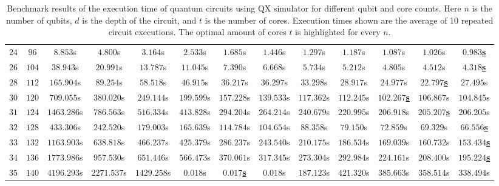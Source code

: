 \begin{table}[H]
\begin{adjustwidth}{-1.6cm}{-1.6cm}
{\begin{tabular}{ccccccccccccc}
            $24$ & $96$ & $8.853$s & $4.800$s & $3.164$s & $2.533$s & $1.685$s & $1.446$s & $1.297$s & $1.187$s & $1.087$s & $1.026$s & \underline{$\mathbf{0.983}$\textbf{s}} \\
            $26$ & $104$ & $38.943$s & $20.991$s & $13.787$s & $11.045$s & $7.390$s & $6.668$s & $5.734$s & $5.212$s & $4.805$s & $4.512$s & \underline{$\mathbf{4.318}$\textbf{s}} \\
            $28$ & $112$ & $165.904$s & $89.254$s & $58.518$s & $46.915$s & $36.217$s & $36.297$s & $33.298$s & $28.917$s & $24.977$s & \underline{$\mathbf{22.797}$\textbf{s}} & $27.495$s \\
            $30$ & $120$ & $709.055$s & $380.020$s & $249.144$s & $199.599$s & $157.228$s & $139.533$s & $117.362$s & $112.245$s & \underline{$\mathbf{102.267}$\textbf{s}} & $106.867$s & $104.845$s \\
            $31$ & $124$ & $1463.286$s & $786.563$s & $516.334$s & $413.828$s & $294.204$s & $264.214$s & $240.679$s & $220.995$s & $206.918$s & \underline{$\mathbf{205.207}$\textbf{s}} & $206.205$s \\
            $32$ & $128$ & $433.306$s & $242.520$s & $179.003$s & $165.639$s & $114.784$s & $104.654$s & $88.358$s & $79.150$s & $72.859$s & $69.329$s & \underline{$\mathbf{66.556}$\textbf{s}} \\
            $33$ & $132$ & $1163.903$s & $638.818$s & $466.237$s & $425.379$s & $286.237$s & $243.540$s & $210.175$s & $186.534$s & $169.039$s & $160.732$s & \underline{$\mathbf{153.434}$\textbf{s}} \\
            $34$ & $136$ & $1773.986$s & $957.530$s & $651.446$s & $566.473$s & $370.061$s & $317.345$s & $273.304$s & $292.984$s & $224.161$s & $208.400$s & \underline{$\mathbf{195.224}$\textbf{s}} \\
            $35$ & $140$ & $4196.293$s & $2271.537$s & $1429.258$s & $0.018$s & \underline{$\mathbf{0.017}$\textbf{s}} & $0.018$s & $187.123$s & $421.320$s & $385.663$s & $358.514$s & $338.494$s \\
            
        \end{tabular}
    }
    \end{adjustwidth}
    \caption[Benchmark results of the execution time of quantum circuits using QX simulator for different qubit and core counts.]{
        Benchmark results of the execution time of quantum circuits using QX simulator for different qubit and core counts.
        Here $n$ is the number of qubits, $d$ is the depth of the circuit, and $t$ is the number of cores.
        Execution times shown are the average of 10 repeated circuit executions.
        The optimal amount of cores $t$ is highlighted for every $n$.
    }
    \label{table:qx-benchmark}
\end{table}

